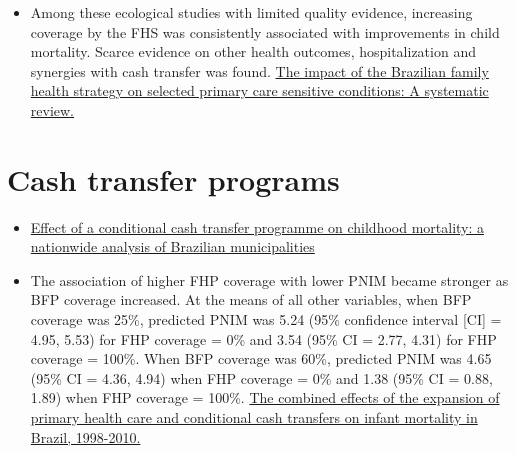 \documentclass[]{book}
\begin{document}
\begin{itemize}
\item
  Among these ecological studies with limited quality evidence, increasing coverage by the FHS was consistently associated with improvements in child mortality. Scarce evidence on other health outcomes, hospitalization and synergies with cash transfer was found. \href{https://journals.plos.org/plosone/article?id=10.1371/journal.pone.0182336}{The impact of the Brazilian family health strategy on selected primary care sensitive conditions: A systematic review.}
\end{itemize}

\hypertarget{cash-transfer-programs}{%
\section*{Cash transfer programs}\label{cash-transfer-programs}}

\begin{itemize}
\item
  \href{https://sci-hub.tw/https://doi.org/10.1016/S0140-6736(13)60715-1}{Effect of a conditional cash transfer programme on childhood mortality: a nationwide analysis of Brazilian municipalities}
\item
  The association of higher FHP coverage with lower PNIM became stronger as BFP coverage increased. At the means of all other variables, when BFP coverage was 25\%, predicted PNIM was 5.24 (95\% confidence interval {[}CI{]} = 4.95, 5.53) for FHP coverage = 0\% and 3.54 (95\% CI = 2.77, 4.31) for FHP coverage = 100\%. When BFP coverage was 60\%, predicted PNIM was 4.65 (95\% CI = 4.36, 4.94) when FHP coverage = 0\% and 1.38 (95\% CI = 0.88, 1.89) when FHP coverage = 100\%. \href{https://www.ncbi.nlm.nih.gov/pmc/articles/PMC3828713/pdf/AJPH.2013.301452.pdf}{The combined effects of the expansion of primary health care and conditional cash transfers on infant mortality in Brazil, 1998-2010.}
\end{itemize}


\end{document}
